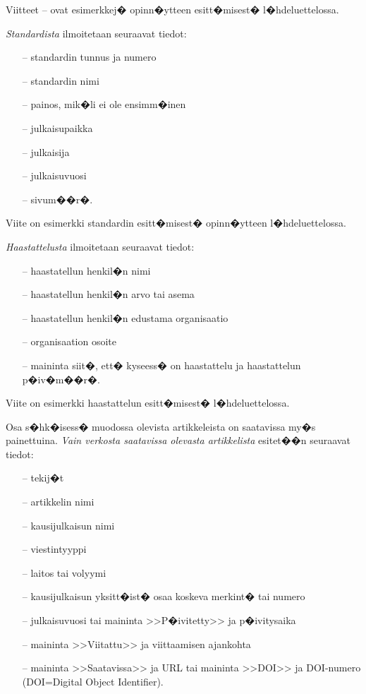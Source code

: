 \documentclass[finnish,12pt,a4paper,pdftex]{article}
\begin{document}
Viitteet \cite{Miinusmaa}--\cite{Lonnqvist} ovat esimerkkej�
opinn�ytteen esitt�misest� l�hdeluettelossa. 

\textit{Standardista} ilmoitetaan seuraavat tiedot:

\begin{itemize}
\item[--]standardin tunnus ja numero
\item[--]standardin nimi
\item[--]painos, mik�li ei ole ensimm�inen
\item[--]julkaisupaikka
\item[--]julkaisija
\item[--]julkaisuvuosi
\item[--]sivum��r�.
\end{itemize}
Viite \cite{sfs} on esimerkki standardin esitt�misest� opinn�ytteen
l�hdeluettelossa. 

\textit{Haastattelusta} ilmoitetaan seuraavat tiedot:

\begin{itemize}
\item[--]haastatellun henkil�n nimi
\item[--]haastatellun henkil�n arvo tai asema
\item[--]haastatellun henkil�n edustama organisaatio
\item[--]organisaation osoite
\item[--]maininta siit�, ett� kyseess� on haastattelu ja haastattelun
p�iv�m��r�. 
\end{itemize}

Viite \cite{haastattelu} on esimerkki 
haastattelun esitt�misest� l�hdeluettelossa.

Osa s�hk�isess� muodossa olevista artikkeleista on saatavissa my�s
painettuina. \textit{Vain verkosta saatavissa olevasta artikkelista} esitet��n
seuraavat tiedot:

\begin{itemize}
\item[--]tekij�t
\item[--]artikkelin nimi
\item[--]kausijulkaisun nimi
\item[--]viestintyyppi
\item[--]laitos tai volyymi
\item[--]kausijulkaisun yksitt�ist� osaa koskeva merkint� tai numero
\item[--]julkaisuvuosi tai maininta >>P�ivitetty>> ja p�ivitysaika
\item[--]maininta >>Viitattu>> ja viittaamisen ajankohta 
\item[--]maininta >>Saatavissa>> ja URL tai 
        maininta >>DOI>> ja DOI-numero (DOI=Digital Object Identifier).
\end{itemize}
\end{document}

